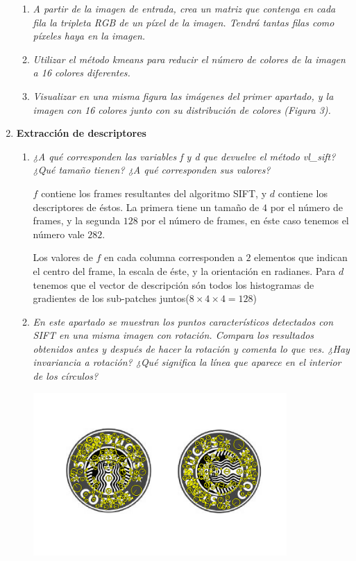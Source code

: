 \documentclass{article}
\begin{document}
\begin{enumerate}
\begin{enumerate}
  \item \textit{A partir de la imagen de entrada, crea un matriz que contenga en cada fila la tripleta RGB de un píxel de la imagen. Tendrá tantas filas como píxeles 
haya en la imagen.}

 \item \textit{Utilizar el método kmeans para reducir el número de colores de la imagen 
a 16 colores diferentes.}
 
 \item \textit{Visualizar  en  una  misma  figura  las  imágenes  del  primer  apartado,  y  la 
imagen con 16 colores junto con su distribución de colores (Figura 3).} 
 
 \end{enumerate}

\newpage

 \item \textbf{ Extracción de descriptores } 
 
 \begin{enumerate}
 \item \textit{¿A  qué  corresponden  las  variables f y  d que  devuelve  el método  vl\_sift? ¿Qué tamaño tienen? ¿A qué corresponden sus valores?}  
 
 $f$ contiene los frames resultantes del algoritmo SIFT, y $d$ contiene los descriptores de éstos. La primera tiene un tamaño de $4$ por el número de frames, y la segunda $128$ por el número de frames, en éste caso tenemos el número vale $282$.
 
 Los valores de $f$ en cada columna corresponden a $2$ elementos que indican el centro del frame, la escala de éste, y la orientación en radianes. Para $d$ tenemos que el vector de descripción són todos los histogramas de gradientes de los sub-patches juntos($8 \times 4 \times 4 = 128$)
 
 \item \textit{En  este  apartado  se muestran  los  puntos  característicos  detectados  con SIFT  en  una  misma  imagen  con  rotación.  Compara  los  resultados 
obtenidos antes y después de hacer la rotación y comenta lo que ves. ¿Hay 
invariancia a rotación? ¿Qué significa la línea que aparece en el interior de 
los círculos?}

\begin{center}
	\includegraphics[width=0.8\textwidth]{ej34b.png}
\end{center}


\end{enumerate}
\end{enumerate}
\end{document}
